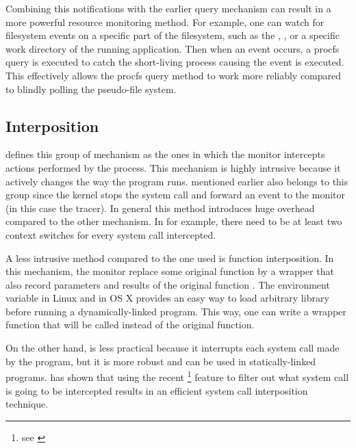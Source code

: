 Combining this notifications with the earlier query mechanism can result in a more powerful resource monitoring method.
For example, one can watch for filesystem events on a specific part of the filesystem, such as the , , or a specific work directory of the running application. Then when an event occurs, a procfs query is executed to catch the short-living process causing the event is executed.
This effectively allows the procfs query method to work more reliably compared to blindly polling the pseudo-file system.

\subsection{Interposition}

\citet{juvePracticalResourceMonitoring2015} defines this group of mechanism as the ones in which the monitor intercepts actions performed by the process.
This mechanism is highly intrusive because it actively changes the way the program runs.
 mentioned earlier also belongs to this group since the kernel stops the system call and forward an event to the monitor (in this case the tracer).
In general this method introduces huge overhead compared to the other mechanism.
In  for example, there need to be at least two context switches for every system call intercepted.

A less intrusive method compared to the one  used is function interposition.
In this mechanism, the monitor replace some original function by a wrapper that also record parameters and results of the original function \citep{juvePracticalResourceMonitoring2015}.
The environment variable  in Linux and  in OS X provides an easy way to load arbitrary library before running a dynamically-linked program.
This way, one can write a wrapper function that will be called instead of the original function.

On the other hand,  is less practical because it interrupts each system call made by the program, but it is more robust and can be used in statically-linked programs.
\citet{kimPracticalEffectiveSandboxing2013} has shown that using the recent \footnote{see \href{http://man7.org/linux/man-pages/man2/seccomp.2.html}{}} feature to filter out what system call is going to be intercepted results in an efficient system call interposition technique.

